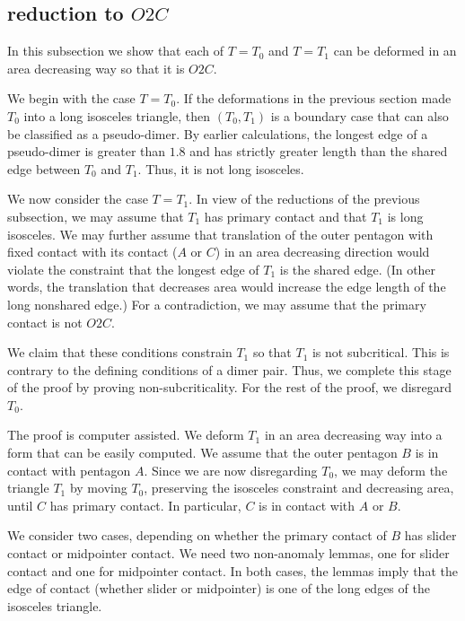 \subsection{reduction to $O2C$}\label{sec:O2C}

In this subsection we show that each of $T=T_0$ and $T=T_1$ can be deformed in an area decreasing way
so that
it is $O2C$.  

We begin with the case $T=T_0$.  If the deformations in the previous section made $T_0$ into a long isosceles triangle,
then $(T_0,T_1)$ is a boundary case that  can also be classified as a pseudo-dimer.  By earlier calculations, the longest edge
of a pseudo-dimer is greater than $1.8$ and has strictly greater length than the shared edge between $T_0$ and $T_1$.
Thus, it is not long isosceles.

We now consider the case $T=T_1$.
In view of the reductions of the previous subsection, we may assume that $T_1$ has primary contact and
that $T_1$ is long isosceles.  We may further assume  that translation of the outer pentagon with fixed contact with its contact ($A$ or $C$)
in an area decreasing direction would violate the constraint that the longest edge of $T_1$ is the shared edge.  (In other words,
the translation that decreases area would increase the edge length of the long nonshared edge.)
For a contradiction, we may assume that the primary contact is not $O2C$.

We claim that these conditions constrain $T_1$ so that $T_1$ is not subcritical.  This is contrary to the defining
conditions of a dimer pair.  Thus, we complete this stage of the proof by proving non-subcriticality. For the rest of the proof, we disregard $T_0$.

The proof is computer assisted.  We deform $T_1$ in an area decreasing way into
a form that can be easily computed.  We assume that the outer pentagon $B$ is in contact with pentagon $A$.
Since we are now disregarding $T_0$, we may deform the triangle $T_1$ by moving $T_0$, preserving the isosceles constraint and decreasing area,
until $C$ has primary contact.  In particular, $C$ is in contact with $A$ or $B$.

We consider two cases, depending on whether the primary contact of  $B$ has slider contact  or midpointer contact.  
We need two non-anomaly lemmas, one for slider contact and one for midpointer contact.  In both cases, the lemmas imply that the
edge of contact (whether slider or midpointer) is one of the long edges of the isosceles triangle.

